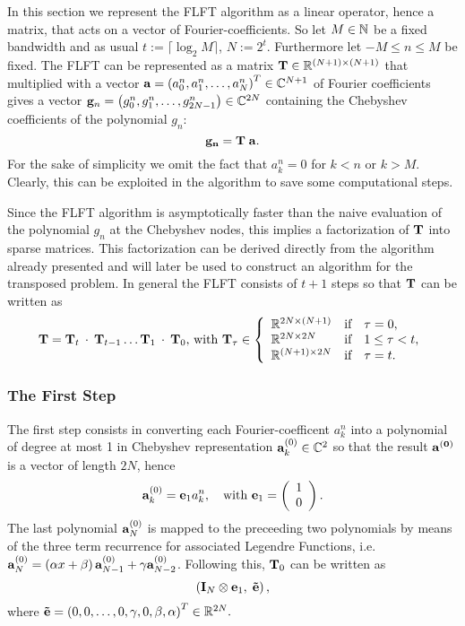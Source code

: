 In this section we represent the FLFT algorithm as a linear operator, hence a matrix, that acts on a vector of Fourier-coefficients. So let $M \in \mathbb{N}$ be a fixed bandwidth and as usual $t := \lceil\log_2{M}\rceil$, $N := 2^t$. Furthermore let  $-M \le n \le M$ be fixed. The FLFT can be represented as a matrix $\mathbf{T} \in \mathbb{R}^{(N+1) \times (N+1)}$ that multiplied with a vector $\mathbf{a} = \left(a_0^n,a_1^n,\dots,a_N^n\right)^T \in \mathbb{C}^{N+1}$ of Fourier coefficients gives a vector $\mathbf{g}_n = \left(g_0^n,g_1^n,\dots,g_{2N-1}^n\right) \in \mathbb{C}^{2N}$ containing the Chebyshev coefficients of the polynomial $g_n$: $$\mathbf{g_{n}} = \mathbf{T} \; \mathbf{a}.$$ For the sake of simplicity we omit the fact that $a_{k}^n = 0$ for $k < n$ or $k > M$. Clearly, this can be exploited in the algorithm to save some computational steps.

Since the FLFT algorithm is asymptotically faster than the naive evaluation of the polynomial $g_{n}$ at the Chebyshev nodes, this implies a factorization of $\mathbf{T}$ into sparse matrices. This factorization can be derived directly from the algorithm already presented and will later be used to construct an algorithm for the transposed problem. In general the FLFT consists of $t+1$ steps so that $\mathbf{T}$ can be written as $$\mb{T} = \mb{T}_{t} \: \cdot \:  \mb{T}_{t-1} \dots \mb{T}_{1} \: \cdot \:  \mb{T}_{0} \text{, with } \mb{T}_{\tau} \in \left\{\begin{array}{l@{\quad \text{if} \quad}l} \R^{2N \times (N+1)} & \tau = 0, \\ \R^{2N \times 2N} & 1 \le \tau < t, \\ \R^{(N+1) \times 2N} & \tau = t. \end{array}\right.$$

\subsubsection{The First Step}

The first step consists in converting each Fourier-coefficent $a_{k}^n$ into a polynomial of degree at most 1 in Chebyshev representation $\mathbf{a}_{k}^{(0)} \in \mathbb{C}^2$ so that the result $\mathbf{a^{(0)}}$ is a vector of length $2N$, hence $$ \mathbf{a}_{k}^{(0)} = \mathbf{e}_{1} a_{k}^n,\quad \text{with } \mathbf{e}_{1} = \left(\begin{array}{l}1\\0\end{array}\right).$$
The last polynomial $\mathbf{a}_{N}^{(0)}$ is mapped to the preceeding two polynomials by means of the three term recurrence for associated Legendre Functions, i.e. $\mathbf{a}_{N}^{(0)} = \left(\alpha x + \beta\right)\mathbf{a}_{N-1}^{(0)} + \gamma \mathbf{a}_{N-2}^{(0)}$. Following this, $\mathbf{T}_{0}$ can be written as
$$\left(\mathbf{I}_{N} \otimes \mathbf{e}_{1},\;\mathbf{\tilde{e}}\right),$$ 
where $\mathbf{\tilde{e}} = \left(0,0,\dots,0,\gamma, 0, \beta,\alpha\right)^T \in \mathbb{R}^{2N}.$

